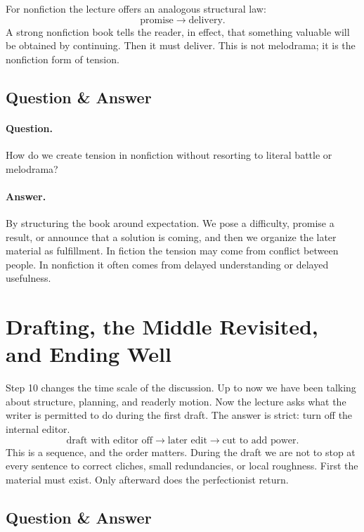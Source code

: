 For nonfiction the lecture offers an analogous structural law:
\begin{equation}
\text{promise} \to \text{delivery}.
\end{equation}
A strong nonfiction book tells the reader, in effect, that something valuable will be obtained by continuing. Then it must deliver. This is not melodrama; it is the nonfiction form of tension.

\subsection{Question \& Answer}

\paragraph{Question.} How do we create tension in nonfiction without resorting to literal battle or melodrama?

\paragraph{Answer.} By structuring the book around expectation. We pose a difficulty, promise a result, or announce that a solution is coming, and then we organize the later material as fulfillment. In fiction the tension may come from conflict between people. In nonfiction it often comes from delayed understanding or delayed usefulness.

\section{Drafting, the Middle Revisited, and Ending Well}

Step 10 changes the time scale of the discussion. Up to now we have been talking about structure, planning, and readerly motion. Now the lecture asks what the writer is permitted to do during the first draft. The answer is strict: turn off the internal editor.
\begin{equation}
\text{draft with editor off} \to \text{later edit} \to \text{cut to add power}.
\end{equation}
This is a sequence, and the order matters. During the draft we are not to stop at every sentence to correct cliches, small redundancies, or local roughness. First the material must exist. Only afterward does the perfectionist return.

\subsection{Question \& Answer}

